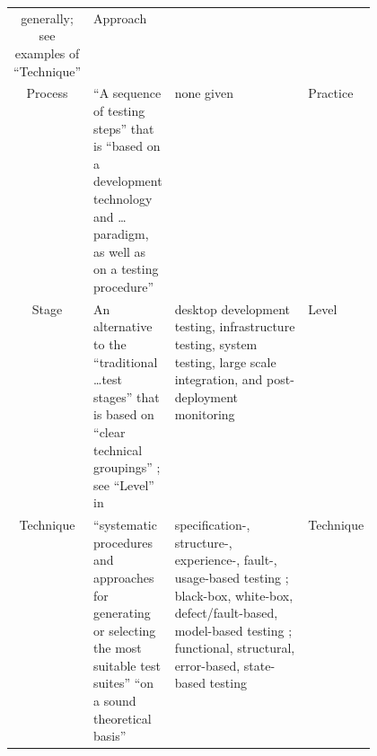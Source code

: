 \begin{table}[hbtp!]
\begin{tabularx}{\linewidth}{|c|X|m{0.37\linewidth}|m{0.1\linewidth}|}
            generally; see examples of
            ``Technique''                      & Approach                                                    \\
            Process                            & ``A sequence of
            testing steps'' \citep[p.~2]{BarbosaEtAl2006} that
            is ``based on a development technology and \dots
            paradigm, as well as on a testing procedure''
            \citep[p.~3]{BarbosaEtAl2006}      & none given         & Practice                               \\
            Stage                              & An
            alternative to the ``traditional \dots test stages'' that is based on
            ``clear technical groupings'' \citep[p.~13]{Gerrard2000a}; see ``Level'' in
            \nameref{tab:ieeeTestTerms}        & desktop
            development testing, infrastructure testing, system testing,
            large scale integration, and post-deployment monitoring
            \citep[p.~13]{Gerrard2000a}        & Level                                                       \\
            Technique                          & ``systematic
            procedures and approaches for generating or selecting the most suitable test
            suites'' \citep[p.~5-10]{SWEBOK2024} ``on a sound theoretical basis''
            \citep[p.~3]{BarbosaEtAl2006}      & specification-,
            structure-, experience-, fault-, usage-based testing \citep[pp.~5-10, 5-13 to 5-15]{SWEBOK2024};
            black-box, white-box, defect/fault-based, model-based testing \citep[p.~3]{SouzaEtAl2017};
            functional, structural, error-based, state-based testing
            \citep[p.~3]{BarbosaEtAl2006}
                                               & Technique                                                   \\
            \hline
      \end{tabularx}
\end{table}

